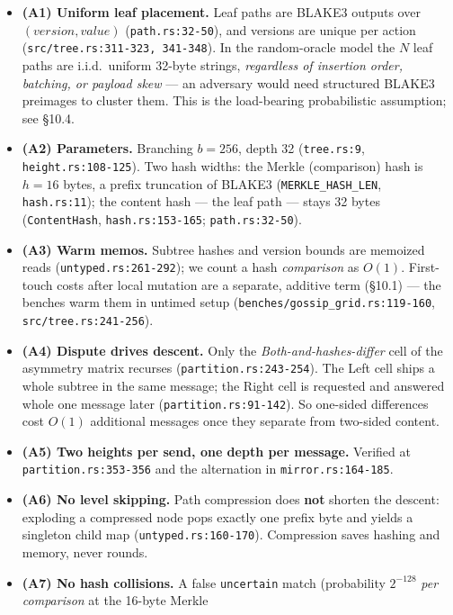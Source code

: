 \documentclass[11pt]{article}
\newcommand{\code}[1]{\texttt{#1}}
\theoremstyle{plain}
\begin{document}
\begin{itemize}
\item \textbf{(A1) Uniform leaf placement.} Leaf paths are BLAKE3 outputs
  over $(\textit{version}, \textit{value})$ (\code{path.rs:32-50}), and
  versions are unique per action (\code{src/tree.rs:311-323, 341-348}). In the
  random-oracle model the $N$ leaf paths are i.i.d.\ uniform 32-byte
  strings, \emph{regardless of insertion order, batching, or payload
  skew} --- an adversary would need structured BLAKE3 preimages to cluster
  them. This is the load-bearing probabilistic assumption; see \S10.4.
\item \textbf{(A2) Parameters.} Branching $b = 256$, depth 32
  (\code{tree.rs:9}, \code{height.rs:108-125}). Two hash widths: the
  Merkle (comparison) hash is $h = 16$ bytes, a prefix truncation of
  BLAKE3 (\code{MERKLE\_HASH\_LEN}, \code{hash.rs:11}); the content hash
  --- the leaf path --- stays 32 bytes (\code{ContentHash},
  \code{hash.rs:153-165}; \code{path.rs:32-50}).
\item \textbf{(A3) Warm memos.} Subtree hashes and version bounds are
  memoized reads (\code{untyped.rs:261-292}); we count a hash
  \emph{comparison} as $O(1)$. First-touch costs after local mutation are a
  separate, additive term (\S10.1) --- the benches warm them in untimed
  setup (\code{benches/gossip\_grid.rs:119-160}, \code{src/tree.rs:241-256}).
\item \textbf{(A4) Dispute drives descent.} Only the
  \emph{Both-and-hashes-differ} cell of the asymmetry matrix recurses
  (\code{partition.rs:243-254}). The Left cell ships a whole subtree in the
  same message; the Right cell is requested and answered whole one message
  later (\code{partition.rs:91-142}). So one-sided differences cost $O(1)$
  additional messages once they separate from two-sided content.
\item \textbf{(A5) Two heights per send, one depth per message.} Verified
  at \code{partition.rs:}\allowbreak\code{353-356} and the alternation in
  \code{mirror.rs:}\allowbreak\code{164-185}.
\item \textbf{(A6) No level skipping.} Path compression does \textbf{not}
  shorten the descent: exploding a compressed node pops exactly one prefix
  byte and yields a singleton child map (\code{untyped.rs:160-170}).
  Compression saves hashing and memory, never rounds.
\item \textbf{(A7) No hash collisions.} A false \code{uncertain} match
  (probability $2^{-128}$ \emph{per comparison} at the 16-byte Merkle

\end{itemize}
\end{document}
